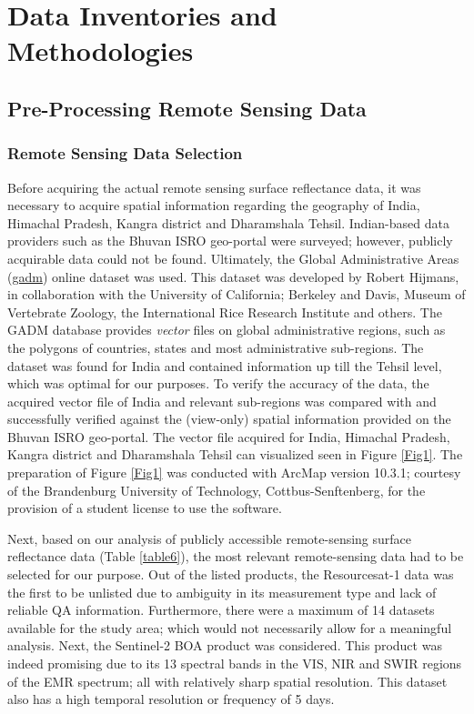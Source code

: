 \section{Data Inventories and Methodologies}

\subsection{Pre-Processing Remote Sensing Data}

\subsubsection{Remote Sensing Data Selection}

\justify
Before acquiring the actual remote sensing surface reflectance data, it was necessary to acquire spatial information regarding the geography of India, Himachal Pradesh, Kangra district and Dharamshala Tehsil. Indian-based data providers such as the Bhuvan ISRO geo-portal were surveyed; however, publicly acquirable data could not be found. Ultimately, the Global Administrative Areas (\href{http://gadm.org/about}{\ac{gadm}}) online dataset was used. This dataset was developed by Robert Hijmans, in collaboration with the University of California; Berkeley and Davis, Museum of Vertebrate Zoology, the International Rice Research Institute and others. The GADM database provides \textit{vector} files on global administrative regions, such as the polygons of countries, states and most administrative sub-regions. The dataset was found for India and contained information up till the Tehsil level, which was optimal for our purposes. To verify the accuracy of the data, the acquired vector file of India and relevant sub-regions was compared with and successfully verified against the (view-only) spatial information provided on the Bhuvan ISRO geo-portal. The vector file acquired for India, Himachal Pradesh, Kangra district and Dharamshala Tehsil can visualized seen in Figure \ref{Fig1}. The preparation of Figure \ref{Fig1} was conducted with ArcMap version 10.3.1; courtesy of the Brandenburg University of Technology, Cottbus-Senftenberg, for the provision of a student license to use the software. 

\justify
Next, based on our analysis of publicly accessible remote-sensing surface reflectance data (Table \ref{table6}), the most relevant remote-sensing data had to be selected for our purpose. Out of the listed products, the Resourcesat-1 data was the first to be unlisted due to ambiguity in its measurement type and lack of reliable QA information. Furthermore, there were a maximum of 14 datasets available for the study area; which would not necessarily allow for a meaningful analysis. Next, the Sentinel-2 BOA product was considered. This product was indeed promising due to its 13 spectral bands in the VIS, NIR and SWIR regions of the EMR spectrum; all with relatively sharp spatial resolution. This dataset also has a high temporal resolution or frequency of 5 days. 

